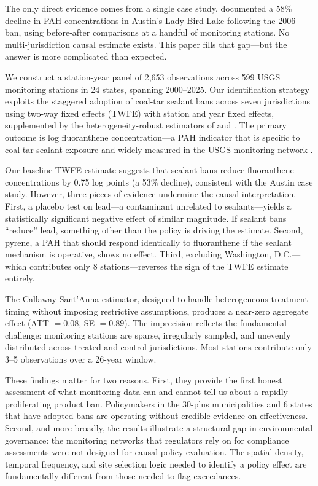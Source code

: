\documentclass[12pt]{article}
\begin{document}
The only direct evidence comes from a single case study. \citet{vanmetre2014decline} documented a 58\% decline in PAH concentrations in Austin's Lady Bird Lake following the 2006 ban, using before-after comparisons at a handful of monitoring stations. No multi-jurisdiction causal estimate exists. This paper fills that gap---but the answer is more complicated than expected.

We construct a station-year panel of 2,653 observations across 599 USGS monitoring stations in 24 states, spanning 2000--2025. Our identification strategy exploits the staggered adoption of coal-tar sealant bans across seven jurisdictions using two-way fixed effects (TWFE) with station and year fixed effects, supplemented by the heterogeneity-robust estimators of \citet{callaway2021difference} and \citet{sun2021estimating}. The primary outcome is log fluoranthene concentration---a PAH indicator that is specific to coal-tar sealant exposure and widely measured in the USGS monitoring network \citep{vanmetre2012use}.

Our baseline TWFE estimate suggests that sealant bans reduce fluoranthene concentrations by 0.75 log points (a 53\% decline), consistent with the Austin case study. However, three pieces of evidence undermine the causal interpretation. First, a placebo test on lead---a contaminant unrelated to sealants---yields a statistically significant negative effect of similar magnitude. If sealant bans ``reduce'' lead, something other than the policy is driving the estimate. Second, pyrene, a PAH that should respond identically to fluoranthene if the sealant mechanism is operative, shows no effect. Third, excluding Washington, D.C.---which contributes only 8 stations---reverses the sign of the TWFE estimate entirely.

The Callaway-Sant'Anna estimator, designed to handle heterogeneous treatment timing without imposing restrictive assumptions, produces a near-zero aggregate effect (ATT $= 0.08$, SE $= 0.89$). The imprecision reflects the fundamental challenge: monitoring stations are sparse, irregularly sampled, and unevenly distributed across treated and control jurisdictions. Most stations contribute only 3--5 observations over a 26-year window.

These findings matter for two reasons. First, they provide the first honest assessment of what monitoring data can and cannot tell us about a rapidly proliferating product ban. Policymakers in the 30-plus municipalities and 6 states that have adopted bans are operating without credible evidence on effectiveness. Second, and more broadly, the results illustrate a structural gap in environmental governance: the monitoring networks that regulators rely on for compliance assessments were not designed for causal policy evaluation. The spatial density, temporal frequency, and site selection logic needed to identify a policy effect are fundamentally different from those needed to flag exceedances.
\end{document}

